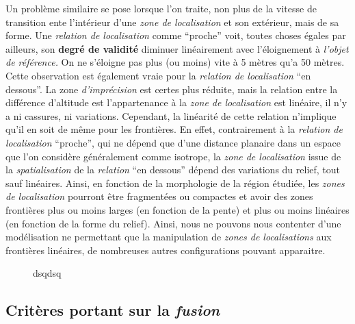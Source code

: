 
Un problème similaire se pose lorsque l'on traite, non plus de la
vitesse de transition ente l'intérieur d'une \emph{zone de
  localisation} et son extérieur, mais de sa forme. Une \emph{relation
  de localisation} comme \enquote{proche} voit, toutes choses égales
par ailleurs, son \textbf{degré de validité} diminuer linéairement
avec l'éloignement à \emph{l'objet de référence.} On ne s'éloigne pas
plus (ou moins) vite à 5 mètres qu'a 50 mètres. Cette observation est
également vraie pour la \emph{relation de localisation} \enquote{en
  dessous}. La zone \emph{d'imprécision} est certes plus réduite, mais
la relation entre la différence d'altitude est l'appartenance à la
\emph{zone de localisation} est linéaire, il n'y a ni cassures, ni
variations. Cependant, la linéarité de cette relation n'implique qu'il
en soit de même pour les frontières. En effet, contrairement à la
\emph{relation de localisation} \enquote{proche}, qui ne dépend que
d'une distance planaire dans un espace que l'on considère généralement
comme isotrope, la \emph{zone de localisation} issue de la
\emph{spatialisation} de la \emph{relation} \enquote{en dessous}
dépend des variations du relief, tout sauf linéaires. Ainsi, en
fonction de la morphologie de la région étudiée, les \emph{zones de
  localisation} pourront être fragmentées ou compactes et avoir des
zones frontières plus ou moins larges (en fonction de la pente) et
plus ou moins linéaires (en fonction de la forme du relief). Ainsi,
nous ne pouvons nous contenter d'une modélisation ne permettant que la
manipulation de \emph{zones de localisations} aux frontières
linéaires, de nombreuses autres configurations pouvant apparaitre.


\begin{figure}
  \centering
  
  \caption{dsqdsq}
  \label{fig:temp}
\end{figure}


\subsection{Critères portant sur la \emph{fusion}}



